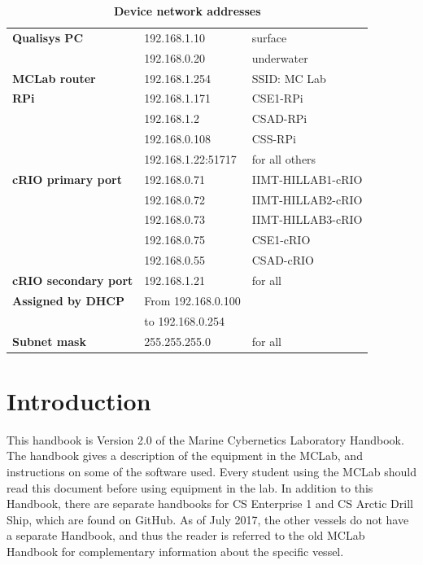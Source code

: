 \documentclass[a4paper,english]{report}
\begin{document}
\clearpage{}\thispagestyle{empty}\vspace*{3cm}
\begin{table}[h!]
	\centering
	\caption*{\huge{\textbf{Device network addresses}}}
	\begin{tabular}{lll}
		\hline
		\textbf{Qualisys PC} & 192.168.1.10 & surface\\
		& 192.168.0.20 & underwater\\ \hline
		\textbf{MCLab router} & 192.168.1.254 & SSID: MC Lab\\ \hline
		\textbf{RPi} & 192.168.1.171 & CSE1-RPi\\
		& 192.168.1.2 & CSAD-RPi\\
		& 192.168.0.108 & CSS-RPi\\
		& 192.168.1.22:51717 & for all others\\ \hline
		\textbf{cRIO primary port} & 192.168.0.71 & IIMT-HILLAB1-cRIO\\
		& 192.168.0.72 & IIMT-HILLAB2-cRIO\\
		& 192.168.0.73 & IIMT-HILLAB3-cRIO\\
		& 192.168.0.75 & CSE1-cRIO\\
		& 192.168.0.55 & CSAD-cRIO\\
		\textbf{cRIO secondary port} & 192.168.1.21 & for all\\ \hline
		\textbf{Assigned by DHCP} & From 192.168.0.100 & \\
		& to 192.168.0.254 & \\ \hline
		\textbf{Subnet mask} & 255.255.255.0 & for all\\ \hline
	\end{tabular}
\end{table}
\clearpage{}

\setcounter{page}{1}

\vspace*{3cm}

\section*{Introduction}

This handbook is Version 2.0 of the Marine Cybernetics Laboratory Handbook. The handbook gives a description of the equipment in the MCLab, and instructions on some of the software used. Every student using the MCLab should read this document before using equipment in the lab. In addition to this Handbook, there are separate handbooks for CS Enterprise 1 and CS Arctic Drill Ship, which are found on GitHub. As of July 2017, the other vessels do not have a separate Handbook, and thus the reader is referred to the old MCLab Handbook for complementary information about the specific vessel. 
\end{document}
